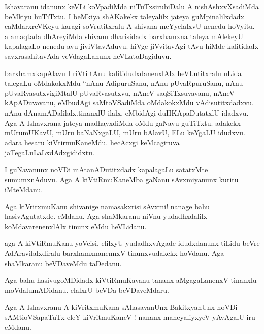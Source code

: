 \documentclass{article}
\begin{document}
\begin{mn}%
Ishavaranu idanunx keVLi koVpadiMda niTuTxsirubiDalu A nishAshxvXsadiMda beMkiyu huTiTxtu. I 
beMkiya shAKakekx taleyalilx jateya guMpinalilxdadx caMdarxreVKeyu karagi soVrutitxralu A 
shivana meYyelalxvU nenedu hoVyitu. a amaqtada dhAreyiMda shivanu dharisidadx barxhamxna 
taleya mAlekeyU kapalagaLo nenedu avu jiviVtavAduvu. hiVge jiVvitavAgi tAvu hiMde 
kalitidadx savxrasahitavAda veVdagaLanunx heVLatoDagiduvu.
\end{mn}

\begin{mn}%
barxhamxkapAlavu I riVti tAnu kalitidudxdanenxlAlx heVLutitxralu uLida talegaLu oMdakokxMdu 
``nAnu AdipuruSanu, nAnu pUvaRpuruSanu, nAnu pUvaRvasutxvigiMtalU pUvaRvasutxvu, nAneV 
saqSiTxsuvavanu, nAneV kApADuvavanu, eMbudAgi saMtoVSadiMda oMdakokxMdu vAdisutitxdadxvu. 
nAnu dAnamADalilalx.tinanxlU ilalx. eMbidAgi duHKApaDutatxlU idadxvu. Aga A Ishavxrana 
jateya madhayxdiMda oMdu gaNavu guTiTxtu. adakekx mUrumUKavU, mUru baNaNxgaLU, mUru bAlavU, 
ELu keYgaLU idudxvu. adara hesaru kiVtirmuKaneMdu. hecAcxgi keMcagiruva 
jaTegaLuLaLxdAdxgididxtu.
\end{mn}

\begin{mn}%
I guNavanunx noVDi mAtanADutitxdadx kapalagaLu satatxMte sumumxnAduvu. Aga A kiVtiRmuKaneMba 
gaNanu sAvxmiyanunx kuritu iMteMdanu.
\end{mn}

\begin{mn}%
Aga kiVritxmuKanu shivanige namasakxrisi sAvxmi! nanage bahu hasivAgutatxde. eMdanu. Aga 
shaMkaranu niVnu yudadhxdalilx koMdavarenenxlAlx tinunx eMdu heVLidanu.
\end{mn}

\begin{mn}%
aga A kiVtiRmuKanu yoVcisi, elilxyU yudadhxvAgade idudxdanunx tiLidu beVre AdAravilalxdiralu 
barxhamxnanennxV tinunxvudakekx hoVdanu. Aga shaMkaranu beVDaveMdu taDedanu.
\end{mn}

\begin{mn}%
Aga bahu hasivugoMDidadx kiVtiRmuKavanu tananx aMgagaLanenxV tinanxlu moVdalumADidanu. 
elalxrU beVDa beVDaveMdaru.
\end{mn}

\begin{mn}%
Aga A Ishavxranu A kiVritxmuKana sAhasavanUnx BakitxyanUnx noVDi sAMtioVSapaTuTx eleY 
kiVritmuKaneV ! nananx maneyaliyxyeV yAvAgalU iru eMdanu.
\end{mn}
\end{document}
